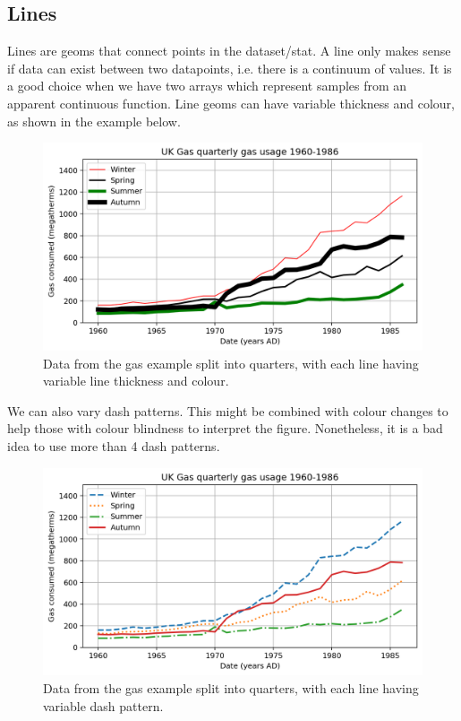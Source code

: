\documentclass[a4paper, openany]{memoir}
\begin{document}
\subsection{Lines}
Lines are geoms that connect points in the dataset/stat. A line only makes sense if data can exist between two datapoints, i.e. there is a continuum of values. It is a good choice when we have two arrays which represent samples from an apparent continuous function. Line geoms can have variable thickness and colour, as shown in the example below.
\begin{figure}[H]
    \centering
    \includegraphics[scale=0.5]{src/2.47 linestyles.png}
    \caption{Data from the gas example split into quarters, with each line having variable line thickness and colour.}
\end{figure}
\noindent We can also vary dash patterns. This might be combined with colour changes to help those with colour blindness to interpret the figure. Nonetheless, it is a bad idea to use more than 4 dash patterns.
\begin{figure}[H]
    \centering
    \includegraphics[scale=0.5]{src/2.48 dotstyle.png}
    \caption{Data from the gas example split into quarters, with each line having variable dash pattern.}
\end{figure}
\end{document}
